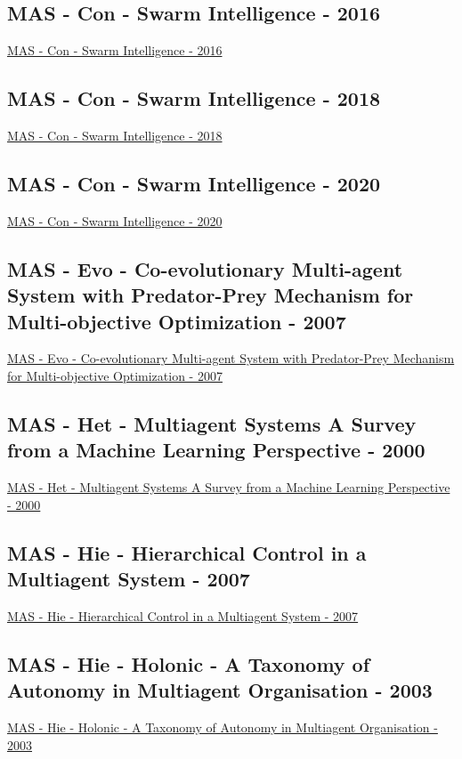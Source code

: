 \subsection{MAS - Con - Swarm Intelligence - 2016}
\href{https://link.springer.com/book/10.1007/978-3-319-44427-7}{MAS - Con - Swarm Intelligence - 2016}

\subsection{MAS - Con - Swarm Intelligence - 2018}
\href{https://link.springer.com/book/10.1007/978-3-030-00533-7}{MAS - Con - Swarm Intelligence - 2018}

\subsection{MAS - Con - Swarm Intelligence - 2020}
\href{https://link.springer.com/book/10.1007/978-3-030-60376-2}{MAS - Con - Swarm Intelligence - 2020}

\subsection{MAS - Evo - Co-evolutionary Multi-agent System with Predator-Prey Mechanism for Multi-objective Optimization - 2007}
\href{https://link.springer.com/chapter/10.1007/978-3-540-71618-1_8}{MAS - Evo - Co-evolutionary Multi-agent System with Predator-Prey Mechanism for Multi-objective Optimization - 2007}

\subsection{MAS - Het - Multiagent Systems A Survey from a Machine Learning Perspective - 2000}
\href{https://link.springer.com/article/10.1023/A:1008942012299}{MAS - Het - Multiagent Systems A Survey from a Machine Learning Perspective - 2000}

\subsection{MAS - Hie - Hierarchical Control in a Multiagent System - 2007}
\href{https://ieeexplore.ieee.org/abstract/document/4427756}{MAS - Hie - Hierarchical Control in a Multiagent System - 2007}

\subsection{MAS - Hie - Holonic - A Taxonomy of Autonomy in Multiagent Organisation - 2003}
\href{https://link.springer.com/chapter/10.1007/978-3-540-25928-2_6}{MAS - Hie - Holonic - A Taxonomy of Autonomy in Multiagent Organisation - 2003}


